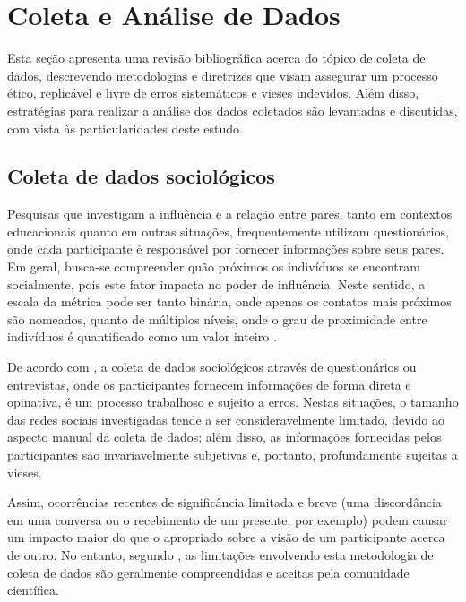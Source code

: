 \section{Coleta e Análise de Dados} \label{sec:data}

Esta seção apresenta uma revisão bibliográfica acerca do tópico de coleta de dados, descrevendo metodologias e diretrizes que visam assegurar um processo ético, replicável e livre de erros sistemáticos e vieses indevidos. Além disso, estratégias para realizar a análise dos dados coletados são levantadas e discutidas, com vista às particularidades deste estudo.

\subsection{Coleta de dados sociológicos} \label{sec:collection}

Pesquisas que investigam a influência e a relação entre pares, tanto em contextos educacionais quanto em outras situações, frequentemente utilizam questionários, onde cada participante é responsável por fornecer informações sobre seus pares. Em geral, busca-se compreender quão próximos os indivíduos se encontram socialmente, pois este fator impacta no poder de influência. Neste sentido, a escala da métrica pode ser tanto binária, onde apenas os contatos mais próximos são nomeados, quanto de múltiplos níveis, onde o grau de proximidade entre indivíduos é quantificado como um valor inteiro \cite{Rambaran2017,Blansky2013,Gremmen2017,Bellmore2010,Newman2003,Hymel1986,Schwartz2006}.

De acordo com , a coleta de dados sociológicos através de questionários ou entrevistas, onde os participantes fornecem informações de forma direta e opinativa, é um processo trabalhoso e sujeito a erros. Nestas situações, o tamanho das redes sociais investigadas tende a ser consideravelmente limitado, devido ao aspecto manual da coleta de dados; além disso, as informações fornecidas pelos participantes são invariavelmente subjetivas e, portanto, profundamente sujeitas a vieses.

Assim, ocorrências recentes de significância limitada e breve (uma discordância em uma conversa ou o recebimento de um presente, por exemplo) podem causar um impacto maior do que o apropriado sobre a visão de um participante acerca de outro. No entanto, segundo , as limitações envolvendo esta metodologia de coleta de dados são geralmente compreendidas e aceitas pela comunidade científica.

